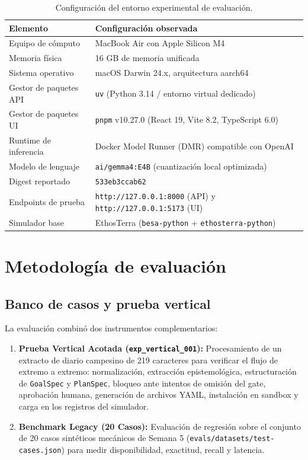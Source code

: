 \documentclass[11pt,a4paper]{article}
\begin{document}
\begin{table}[H]
\centering
\small
\begin{tabularx}{\textwidth}{lX}
\toprule
\textbf{Elemento} & \textbf{Configuración observada} \\
\midrule
Equipo de cómputo & MacBook Air con Apple Silicon M4 \\
Memoria física & 16 GB de memoria unificada \\
Sistema operativo & macOS Darwin 24.x, arquitectura aarch64 \\
Gestor de paquetes API & \texttt{uv} (Python 3.14 / entorno virtual dedicado) \\
Gestor de paquetes UI & \texttt{pnpm} v10.27.0 (React 19, Vite 8.2, TypeScript 6.0) \\
Runtime de inferencia & Docker Model Runner (DMR) compatible con OpenAI \\
Modelo de lenguaje & \texttt{ai/gemma4:E4B} (cuantización local optimizada) \\
Digest reportado & \texttt{533eb3ccab62} \\
Endpoints de prueba & \texttt{http://127.0.0.1:8000} (API) y \texttt{http://127.0.0.1:5173} (UI) \\
Simulador base & EthosTerra (\texttt{besa-python} + \texttt{ethosterra-python}) \\
\bottomrule
\end{tabularx}
\caption{Configuración del entorno experimental de evaluación.}
\label{tab:entorno}
\end{table}

\section{Metodología de evaluación}

\subsection{Banco de casos y prueba vertical}
La evaluación combinó dos instrumentos complementarios:
\begin{enumerate}[leftmargin=*]
    \item \textbf{Prueba Vertical Acotada (\texttt{exp\_vertical\_001}):} Procesamiento de un extracto de diario campesino de 219 caracteres para verificar el flujo de extremo a extremo: normalización, extracción epistemológica, estructuración de \texttt{GoalSpec} y \texttt{PlanSpec}, bloqueo ante intentos de omisión del gate, aprobación humana, generación de archivos YAML, instalación en sandbox y carga en los registros del simulador.
    \item \textbf{Benchmark Legacy (20 Casos):} Evaluación de regresión sobre el conjunto de 20 casos sintéticos mecánicos de Semana 5 (\texttt{evals/datasets/test-cases.json}) para medir disponibilidad, exactitud, recall y latencia.
\end{enumerate}
\end{document}
